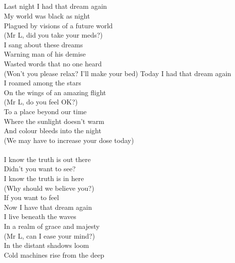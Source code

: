 \tab{}\\
\tab{}\\
\tab{}\\
\tab{}\\
\hop
Last night I had that dream again\\
My world was black as night\tab{}\\
Plagued by visions of a future world\\
(Mr L, did you take your meds?)\\
I sang about these dreams\tab{}\\
Warning man of his demise\tab{}\\
Wasted words that no one heard\\
(Won't you please relax? I'll make your bed)
\hop
Today I had that dream again\tab{}\\
I roamed among the stars\tab{}\\
On the wings of an amazing flight\\
(Mr L, do you feel OK?)\tab{}\\
To a place beyond our time\tab{}\\
Where the sunlight doesn't warm\\
And colour bleeds into the night\\
(We may have to increase your dose today)\\
\hops
\tab{}\tab{}\\
 I know the truth is out there\\
 Didn't you want to see?\tab{}\\
 I know the truth is in here\\
 (Why should we believe you?)\\
 If you want to feel\tab{}\\
\hops
Now I have that dream again\tab{}\\
I live beneath the waves\tab{}\\
In a realm of grace and majesty\\
(Mr L, can I ease your mind?)\tab{}\\
In the distant shadows loom\tab{}\\
Cold machines rise from the deep\\
